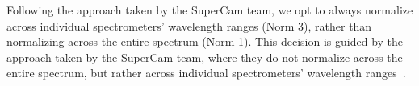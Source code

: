 Following the approach taken by the SuperCam team, we opt to always normalize across individual spectrometers' wavelength ranges (Norm 3), rather than normalizing across the entire spectrum (Norm 1).
This decision is guided by the approach taken by the SuperCam team, where they do not normalize across the entire spectrum, but rather across individual spectrometers' wavelength ranges~\cite{andersonPostlandingMajorElement2022}.